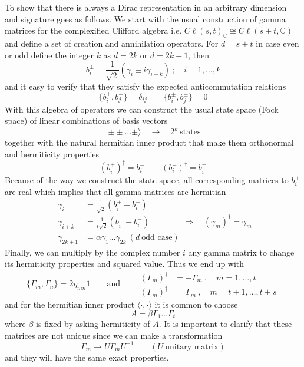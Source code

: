 \documentclass[a4paper,12pt]{article}
\numberwithin{equation}{section}
\numberwithin{thm}{section}
\numberwithin{exm}{section}
\newcommand{\C}{{\mathbb C}}
\newcommand{\<}{{\langle}}
\renewcommand{\>}{{\rangle}}
\renewcommand{\a}{{\alpha}}
\renewcommand{\b}{{\beta}}
\renewcommand{\d}{{\delta}}
\newcommand{\g}{{\gamma}}
\newcommand{\G}{{\Gamma}}
\begin{document}
To show that there is always a Dirac representation in an arbitrary dimension and signature goes as follows. We start with the usual construction of gamma matrices for the complexified Clifford algebra i.e. $C\ell (s,t)_\C \cong C\ell (s+t, \C)$ and  define a set of creation and annihilation operators. For $d = s+t$ in case even or odd define the integer $k$ as $d=2k$ or $d=2k+1$, then
	\begin{equation}
	b^\pm_i = \frac{1}{\sqrt2} (\g_i \pm i \g_{i+k})\ ;\quad i=1,\ldots, k
	\end{equation}
and it easy to verify that they satisfy the expected anticommutation relations
	\begin{equation}
	\{b^+_i, b^-_j\} = \d_{ij}\qquad\{b^\pm_i, b^\pm_j\} = 0
	\end{equation}
With this algebra of operators we can construct the usual state space (Fock space) of linear combinations of basis vectors
	\begin{equation}
	|\pm\pm\ldots\pm\rangle\quad \longrightarrow\quad 2^k\ \text{states}
	\end{equation}
together with the natural hermitian inner product that make them orthonormal and hermiticity properties
	\begin{equation}
	(b^+_i)^\dagger = b^-_i \qquad (b^-_i)^\dagger = b^+_i
	\end{equation}
Because of the way we construct the state space, all corresponding matrices to $b^\pm_i$ are real which implies that all gamma matrices are hermitian
	\begin{equation}
		\begin{aligned}
		\g_i & = \frac{1}{\sqrt2} (b^+_i + b^-_i) \\
		\g_{i+k} & = \frac{1}{i\sqrt2} (b^+_i - b^-_i) \\
		\g_{2k+1} & = \a \g_1\ldots \g_{2k}\ (d\ \text{odd case})
		\end{aligned}
	\Longrightarrow\quad (\g_m)^\dagger = \g_m
	\end{equation}
Finally, we can multiply by the complex number $i$ any gamma matrix to change its hermiticity properties and squared value. Thus we end up with
	\begin{equation}
	\{\G_m, \G_n\} = 2 \eta_{mn}1 \qquad\text{and}\qquad
		\begin{aligned}
		(\G_m)^\dagger & = -\G_m\ ,\quad m=1,\ldots, t\\
		(\G_m)^\dagger & = \G_m\ ,\quad m=t+1,\ldots,t+s
		\end{aligned}
	\end{equation}
and for the hermitian inner product $\langle\cdot,\cdot\rangle$ it is common to choose
	\begin{equation}
	A = \b\G_1\ldots\G_t
	\end{equation}
where $\b$ is fixed by asking hermiticity of $A$. It is important to clarify that these matrices are not unique since we can make a transformation %
	\begin{equation}
	\G_m \longrightarrow U \G_m U^{-1} \qquad (U\ \text{unitary matrix})
	\end{equation}
and they will have the same exact properties.
\end{document}
